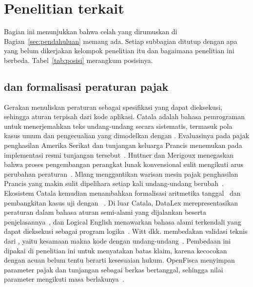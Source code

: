 \section{Penelitian terkait}
\label{sec:terkait}

Bagian ini menunjukkan bahwa celah yang dirumuskan di Bagian~\ref{sec:pendahuluan} memang ada. Setiap subbagian ditutup dengan apa yang belum dikerjakan kelompok penelitian itu dan bagaimana penelitian ini berbeda. Tabel~\ref{tab:posisi} merangkum posisinya.

\subsection{ dan formalisasi peraturan pajak}
\label{subsec:rac}

Gerakan  menuliskan peraturan sebagai spesifikasi yang dapat dieksekusi, sehingga aturan terpisah dari kode aplikasi. Catala adalah bahasa pemrograman untuk menerjemahkan teks undang-undang secara sistematis, termasuk pola kasus umum dan pengecualian yang dimodelkan dengan . Evaluasinya pada pajak penghasilan Amerika Serikat dan tunjangan keluarga Prancis menemukan  pada implementasi resmi tunjangan tersebut~\cite{merigoux2021catala}. Huttner dan Merigoux menegaskan bahwa proses pengembangan perangkat lunak konvensional sulit mengikuti arus perubahan peraturan~\cite{huttner2022catala}. Mlang menggantikan  warisan mesin pajak penghasilan Prancis yang makin sulit dipelihara setiap kali undang-undang berubah~\cite{merigoux2021mlang}. Ekosistem Catala kemudian menambahkan formalisasi aritmetika tanggal~\cite{monat2024date} dan pembangkitan kasus uji dengan ~\cite{goutagny2025cutecat}. Di luar Catala, DataLex merepresentasikan peraturan dalam bahasa aturan semi-alami yang dijalankan  beserta penjelasannya~\cite{mowbray2023scaling,mowbray2023xai}, dan Logical English menawarkan bahasa alami terkendali yang dapat dieksekusi sebagai program logika~\cite{kowalski2022logicalenglish}. Witt dkk. membedakan validasi teknis dari , yaitu kesamaan makna kode dengan undang-undang~\cite{witt2024encoding}. Pembedaan ini dipakai di penelitian ini untuk menyatakan batas klaim, karena kecocokan dengan acuan belum tentu berarti kesesuaian hukum. OpenFisca menyimpan parameter pajak dan tunjangan sebagai berkas bertanggal, sehingga nilai parameter mengikuti masa berlakunya~\cite{openfisca2026rules}.

